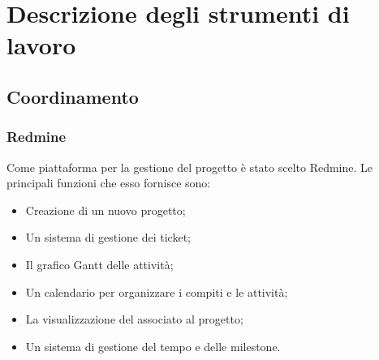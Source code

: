 %
%
%

\appendix
\newpage
\section{Descrizione degli strumenti di lavoro}


\subsection{Coordinamento}

\subsubsection{Redmine}
\label{4.1}
Come piattaforma per la gestione del progetto è stato scelto Redmine. Le principali funzioni che esso fornisce sono:
\begin{itemize}
\item Creazione di un nuovo progetto;
\item Un sistema di gestione dei ticket;
\item Il grafico Gantt delle attività;
\item Un calendario per organizzare i compiti e le attività;
\item La visualizzazione del  associato al progetto;
\item Un sistema di  gestione del tempo e delle milestone.
\end{itemize}



